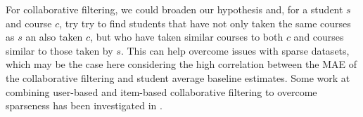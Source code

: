 For collaborative filtering, we could broaden our hypothesis and, for a student $s$ and course $c$, try try to find students that have not only taken the same courses as $s$ an also taken $c$, but who have taken similar courses to both $c$ and courses similar to those taken by $s$.  This can help overcome issues with sparse datasets, which may be the case here considering the high correlation between the MAE of the collaborative filtering and student average baseline estimates.  Some work at combining user-based and item-based collaborative filtering to overcome sparseness has been investigated in \cite{fusion}.
